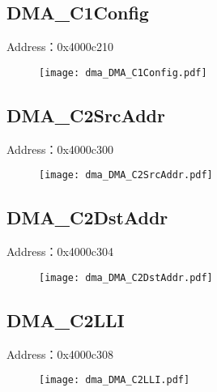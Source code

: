 \subsection{DMA\_C1Config}
\label{dma-DMA-C1Config}
Address：0x4000c210
 \begin{figure}[H]
\texttt{[image: dma\_DMA\_C1Config.pdf]}
\end{figure}

\subsection{DMA\_C2SrcAddr}
\label{dma-DMA-C2SrcAddr}
Address：0x4000c300
 \begin{figure}[H]
\texttt{[image: dma\_DMA\_C2SrcAddr.pdf]}
\end{figure}

\subsection{DMA\_C2DstAddr}
\label{dma-DMA-C2DstAddr}
Address：0x4000c304
 \begin{figure}[H]
\texttt{[image: dma\_DMA\_C2DstAddr.pdf]}
\end{figure}

\subsection{DMA\_C2LLI}
\label{dma-DMA-C2LLI}
Address：0x4000c308
 \begin{figure}[H]
\texttt{[image: dma\_DMA\_C2LLI.pdf]}
\end{figure}

